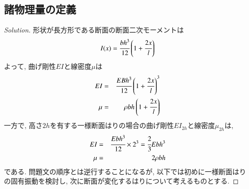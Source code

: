 \documentclass[12pt]{jsarticle}
\newenvironment{solution}
  {\renewcommand\qedsymbol{$\blacksquare$}\begin{proof}[Solution]}
  {\end{proof}}
\begin{document}
\subsection*{諸物理量の定義}
\begin{solution}
形状が長方形である断面の断面二次モーメントは
\begin{eqnarray*}
I(x)=\cfrac{bh^3}{12}\left(1+\cfrac{2x}{l} \right)
\end{eqnarray*}
よって, 曲げ剛性$EI$と線密度$\mu$は
\begin{eqnarray*}
EI &=& \cfrac{EBh^3}{12}\left(1+\cfrac{2x}{l}\right)^3 \\
\mu &=& \rho bh\left(1+\cfrac{2x}{l}\right)
\end{eqnarray*}
一方で, 高さ$2h$を有する一様断面はりの場合の曲げ剛性$EI_{2h}$と線密度$\mu_{2h}$は,
\begin{eqnarray*}
EI &=& \cfrac{Ebh^3}{12}\times 2^3 = \cfrac{2}{3}Ebh^3 \\
\mu &=& 2\rho bh
\end{eqnarray*}
である. 問題文の順序とは逆行することになるが, 以下では初めに一様断面はりの固有振動を検討し, 次に断面が変化するはりについて考えるものとする.

\end{solution}
\end{document}
